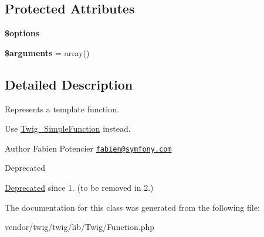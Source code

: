 \subsection*{Protected Attributes}
\begin{DoxyCompactItemize}
\item 
{\bfseries \$options}\hypertarget{classTwig__Function_afbad7a79aabe0101a51c0aff55b307d7}{}\label{classTwig__Function_afbad7a79aabe0101a51c0aff55b307d7}

\item 
{\bfseries \$arguments} = array()\hypertarget{classTwig__Function_acce2278a9ccfc2d81b4eba19d67722f0}{}\label{classTwig__Function_acce2278a9ccfc2d81b4eba19d67722f0}

\end{DoxyCompactItemize}


\subsection{Detailed Description}
Represents a template function.

Use \hyperlink{classTwig__SimpleFunction}{Twig\+\_\+\+Simple\+Function} instead.

\begin{DoxyAuthor}{Author}
Fabien Potencier \href{mailto:fabien@symfony.com}{\tt fabien@symfony.\+com}
\end{DoxyAuthor}
\begin{DoxyRefDesc}{Deprecated}
\item[\hyperlink{deprecated__deprecated000026}{Deprecated}]since 1. (to be removed in 2.) \end{DoxyRefDesc}


The documentation for this class was generated from the following file\+:\begin{DoxyCompactItemize}
\item 
vendor/twig/twig/lib/\+Twig/Function.\+php\end{DoxyCompactItemize}
